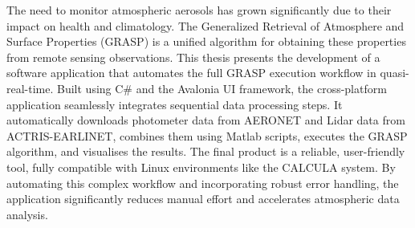 \documentclass[a4paper,12pt]{article}
\begin{document}
The need to monitor atmospheric aerosols has grown significantly due to their impact on health and climatology. The Generalized Retrieval of Atmosphere and Surface Properties (GRASP) is a unified algorithm for obtaining these properties from remote sensing observations. This thesis presents the development of a software application that automates the full GRASP execution workflow in quasi-real-time. Built using C\# and the Avalonia UI framework, the cross-platform application seamlessly integrates sequential data processing steps. It automatically downloads photometer data from AERONET and Lidar data from ACTRIS-EARLINET, combines them using Matlab scripts, executes the GRASP algorithm, and visualises the results. The final product is a reliable, user-friendly tool, fully compatible with Linux environments like the CALCULA system. By automating this complex workflow and incorporating robust error handling, the application significantly reduces manual effort and accelerates atmospheric data analysis.


\clearpage


\clearpage


\clearpage


\clearpage


\clearpage


\clearpage


\clearpage


\clearpage


\clearpage


\clearpage

\newpage

\medskip



\clearpage
\newpage

\end{document}
